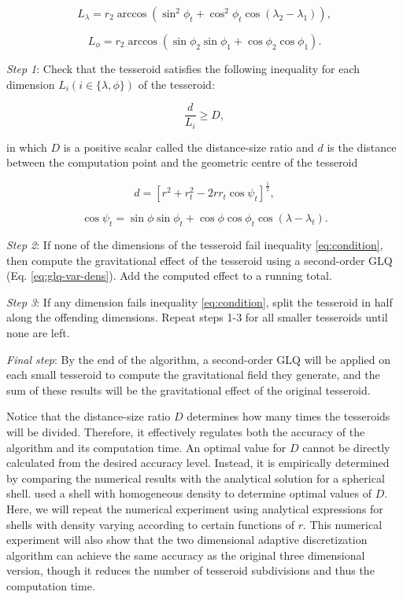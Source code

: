 \documentclass[extra, referee]{gji}
\begin{document}
\begin{equation}
    L_\lambda = r_2 \arccos(\sin^2\phi_t +
        \cos^2\phi_t\cos(\lambda_2 - \lambda_1)),
    \label{eq:sizelon}
\end{equation}

\begin{equation}
    L_\phi = r_2 \arccos(\sin\phi_2\sin\phi_1 + \cos\phi_2\cos\phi_1).
\end{equation}

\textit{Step 1}: Check that the tesseroid satisfies the following inequality for each
dimension $L_i (i \in \{\lambda, \phi\})$ of the tesseroid:

\begin{equation}
    \frac{d}{L_i} \geq D,
    \label{eq:condition}
\end{equation}

\noindent
in which $D$ is a positive scalar called the distance-size ratio and $d$ is the distance
between the computation point and the geometric centre of the tesseroid

\begin{equation}
    d = \left[
        r^2 + r_t^2 - 2 r r_t \cos\psi_t
        \right]^{\frac{1}{2}} ,
    \label{eq:distance}
\end{equation}

\begin{equation}
    \cos\psi_t =
        \sin\phi\sin\phi_t + \cos\phi\cos\phi_t\cos(\lambda - \lambda_t) .
\end{equation}

\textit{Step 2}:
If none of the dimensions of the tesseroid fail inequality
\ref{eq:condition}, then compute the gravitational effect of the tesseroid using a
second-order GLQ (Eq. \ref{eq:glq-var-dens}).
Add the computed effect to a running total.

\textit{Step 3}:
If any dimension fails inequality \ref{eq:condition}, split the tesseroid in half along
the offending dimensions.
Repeat steps 1-3 for all smaller tesseroids until none are left.

\textit{Final step}:
By the end of the algorithm, a second-order GLQ will be applied on each small tesseroid
to compute the gravitational field they generate, and the sum of these results will be
the gravitational effect of the original tesseroid.

Notice that the distance-size ratio $D$ determines how many
times the tesseroids will be divided.
Therefore, it effectively regulates both the accuracy of the algorithm and its
computation time.
An optimal value for $D$ cannot be directly calculated from the desired accuracy level.
Instead, it is empirically determined by comparing the numerical results with the
analytical solution for a spherical shell.
\citet{Uieda2016} used a shell with homogeneous density to determine optimal values of
$D$.
Here, we will repeat the numerical experiment using analytical expressions for shells
with density varying according to certain functions of $r$.
This numerical experiment will also show that the two dimensional adaptive
discretization algorithm can achieve the same accuracy as the original three dimensional
version, though it reduces the number of tesseroid subdivisions and thus the computation
time.
\end{document}
